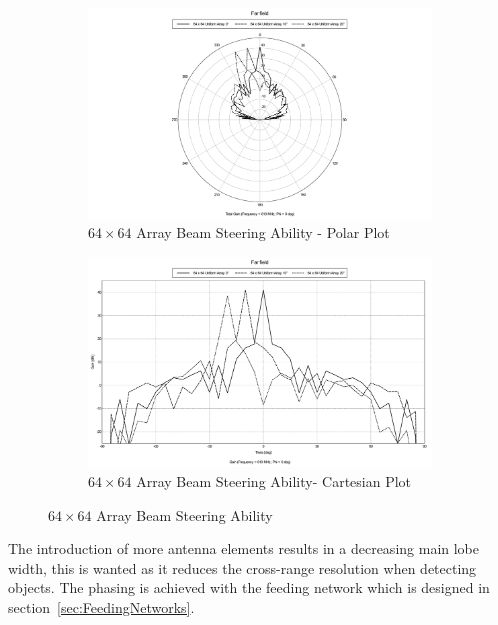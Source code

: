 \documentclass[11pt]{witseiepaper}
\begin{document}
\begin{figure}[htb]
    \centering
    \begin{subfigure}{.5\textwidth}
        \centering
            \includegraphics[width=0.9\linewidth]{SteeringBig-Polar.pdf}
            \caption{$64 \times 64$ Array Beam Steering Ability - Polar Plot}
            \label{fig:SteeringBig-Polar}
        \end{subfigure}%
        \begin{subfigure}{.5\textwidth}
            \centering
            \includegraphics[width=0.9\linewidth]{SteeringBig-Cartesian.pdf}
            \caption{$64 \times 64$ Array Beam Steering Ability- Cartesian Plot}
                \label{fig:SteeringBig-Cartesian}
            \end{subfigure}
\caption{$64 \times 64$ Array Beam Steering Ability}
\label{fig:SteeringBig}
\end{figure}


The introduction of more antenna elements results in a decreasing main lobe width, this is wanted as it reduces the cross-range resolution when detecting objects\cite[p.~14,28,469]{radarHandbook}.
The phasing is achieved with the feeding network which is designed in section~\ref{sec:FeedingNetworks}.
\end{document}
